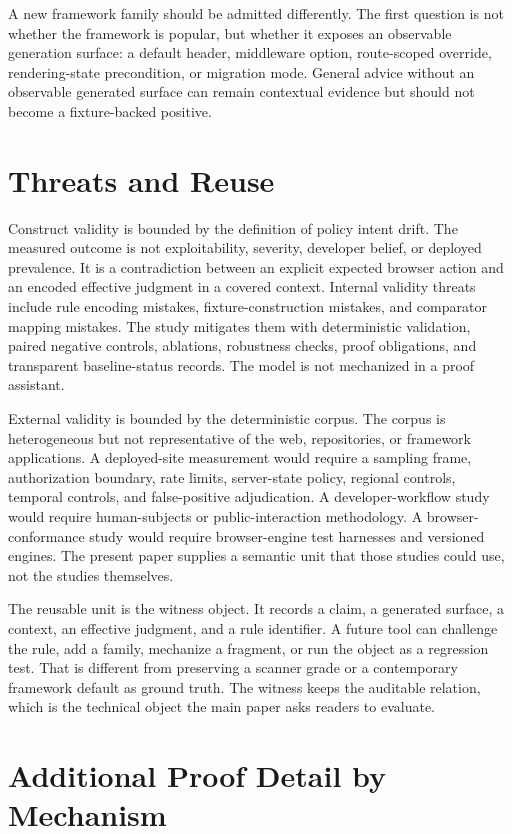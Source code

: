 \documentclass[10pt,conference]{IEEEtran}
\begin{document}
A new framework family should be admitted differently. The first question is not whether the framework is popular, but whether it exposes an observable generation surface: a default header, middleware option, route-scoped override, rendering-state precondition, or migration mode. General advice without an observable generated surface can remain contextual evidence but should not become a fixture-backed positive.

\section{Threats and Reuse}

Construct validity is bounded by the definition of policy intent drift. The measured outcome is not exploitability, severity, developer belief, or deployed prevalence. It is a contradiction between an explicit expected browser action and an encoded effective judgment in a covered context. Internal validity threats include rule encoding mistakes, fixture-construction mistakes, and comparator mapping mistakes. The study mitigates them with deterministic validation, paired negative controls, ablations, robustness checks, proof obligations, and transparent baseline-status records. The model is not mechanized in a proof assistant.

External validity is bounded by the deterministic corpus. The corpus is heterogeneous but not representative of the web, repositories, or framework applications. A deployed-site measurement would require a sampling frame, authorization boundary, rate limits, server-state policy, regional controls, temporal controls, and false-positive adjudication. A developer-workflow study would require human-subjects or public-interaction methodology. A browser-conformance study would require browser-engine test harnesses and versioned engines. The present paper supplies a semantic unit that those studies could use, not the studies themselves.

The reusable unit is the witness object. It records a claim, a generated surface, a context, an effective judgment, and a rule identifier. A future tool can challenge the rule, add a family, mechanize a fragment, or run the object as a regression test. That is different from preserving a scanner grade or a contemporary framework default as ground truth. The witness keeps the auditable relation, which is the technical object the main paper asks readers to evaluate.



\section{Additional Proof Detail by Mechanism}
\end{document}
